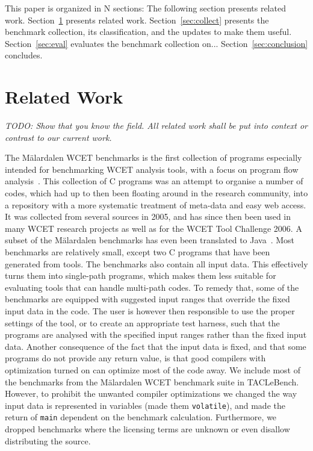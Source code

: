 \documentclass[a4paper,UKenglish]{oasics}
\newcommand{\todo}[1]{{\emph{TODO: #1}}}
\newcommand{\code}[1]{{\small{\texttt{#1}}}}
\begin{document}
This paper is organized in N sections: The following section presents related work.
Section~\ref{sec:related} presents related work.
Section~\ref{sec:collect} presents the benchmark collection, its classification, and the updates
to make them useful.
Section~\ref{sec:eval} evaluates the benchmark collection on...
Section~\ref{sec:conclusion} concludes.

\section{Related Work}
\label{sec:related}

\todo{Show that you know the field. All related work shall be put
into context or contrast to our current work.}

The M{\"a}lardalen WCET benchmarks is the first collection of programs especially
intended for benchmarking WCET analysis tools, with a focus on program flow analysis~\cite{wcet:bench:2012}.
This collection of C programs was an attempt to organise a number of codes, which had up to then been floating around
in the research community, into a repository with a more systematic treatment of meta-data and easy web access.
It was collected from several sources in 2005, and has since then been
used in many WCET research projects as well as for the WCET Tool Challenge 2006.
A subset of the M{\"a}lardalen benchmarks has even been translated to
Java~\cite{jop:volta:rtas2008}. Most benchmarks are relatively small, except
two C programs that have been generated from tools. The benchmarks also
contain all input data. This effectively turns them into single-path programs, which
makes them less suitable for evaluating tools that can handle multi-path codes. To remedy that,
some of the benchmarks are equipped with suggested input ranges that override the fixed
input data in the code. The user is however then responsible to use the proper settings of the tool,
or to create an appropriate test harness, such that the programs are analysed with the specified input ranges
rather than the fixed input data. Another consequence of the fact that the
input data is fixed, and that some programs do not provide
any return value, is that good compilers with optimization turned on can optimize
most of the code away. We include most of the benchmarks from the
 M{\"a}lardalen WCET benchmark suite in TACLeBench. However, to prohibit the unwanted compiler optimizations we changed
 the way input data is represented in variables (made them \code{volatile}),
 and made the return of \code{main} dependent on the benchmark calculation.
 Furthermore, we dropped benchmarks where the licensing terms are unknown
 or even disallow distributing the source.
\end{document}
